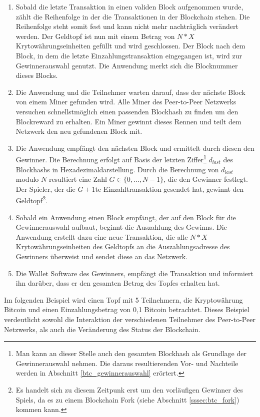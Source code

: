 \begin{enumerate}
\item  Sobald die letzte Transaktion in einen validen Block aufgenommen wurde, zählt die Reihenfolge in der die Transaktionen in der Blockchain stehen. Die Reihenfolge steht somit fest und kann nicht mehr nachträglich verändert werden. Der Geldtopf ist nun mit einem Betrag von $N*X$ Krytowährungseinheiten gefüllt und wird geschlossen. Der Block nach dem Block, in dem die letzte Einzahlungstransaktion eingegangen ist, wird zur Gewinnerauswahl genutzt. Die Anwendung merkt sich die Blocknummer dieses Blocks.
\item Die Anwendung und die Teilnehmer warten darauf, dass der nächste Block von einem Miner gefunden wird. Alle Miner des Peer-to-Peer Netzwerks versuchen schnellstmöglich einen passenden Blockhash zu finden um den Blockreward zu erhalten. Ein Miner gewinnt dieses Rennen und teilt dem Netzwerk den neu gefundenen Block mit.
\item Die Anwendung empfängt den nächsten Block und ermittelt durch diesen den Gewinner. Die Berechnung erfolgt auf Basis der letzten Ziffer\footnote{Man kann an dieser Stelle auch den gesamten Blockhash als Grundlage der Gewinnerauswahl nehmen. Die daraus resultierenden Vor- und Nachteile werden in Abschnitt \ref{btc_gewinnerauswahl} erörtert.} $d_{last}$ des Blockhashs in Hexadezimaldarstellung. Durch die Berechnung von $d_{last}$  modulo $N$ resultiert eine Zahl $G \in \{0,...,N-1\}$, die den Gewinner festlegt. Der Spieler, der die $G+1$te Einzahltransaktion gesendet hat, gewinnt den Geldtopf\footnote{Es handelt sich zu diesem Zeitpunk erst um den vorläufigen Gewinner des Spiels, da es zu einem Blockchain Fork (siehe Abschnitt \ref{sssec:btc_fork}) kommen kann. }.
\item Sobald ein Anwendung einen Block empfängt, der auf den Block für die Gewinnerauswahl aufbaut, beginnt die Auszahlung des Gewinns. Die Anwendung erstellt dazu eine neue Transaktion, die alle $N*X$ Krytowährungseinheiten des Geldtopfs an die Auszahlungsadresse des Gewinners überweist und sendet diese an das Netzwerk.
\item Die Wallet Software des Gewinners, empfängt die Transaktion und informiert ihn darüber, dass er den gesamten Betrag des Topfes erhalten hat.
\end{enumerate}

\vspace{0.75cm}
Im folgenden Beispiel wird einen Topf mit 5 Teilnehmern, die Kryptowährung Bitcoin und einen Einzahlungsbetrag von 0,1 Bitcoin betrachtet. Dieses Beispiel verdeutlicht sowohl die Interaktion der verschiedenen Teilnehmer des Peer-to-Peer Netzwerks, als auch die Veränderung des Status der Blockchain.

